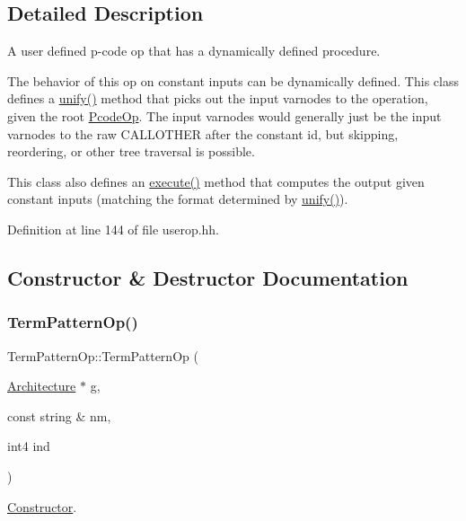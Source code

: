 \subsection{Detailed Description}
A user defined p-\/code op that has a dynamically defined procedure. 

The behavior of this op on constant inputs can be dynamically defined. This class defines a \mbox{\hyperlink{class_term_pattern_op_afe2a8a69c8f803e3134eaaaf087cc0b0}{unify()}} method that picks out the input varnodes to the operation, given the root \mbox{\hyperlink{class_pcode_op}{Pcode\+Op}}. The input varnodes would generally just be the input varnodes to the raw C\+A\+L\+L\+O\+T\+H\+ER after the constant id, but skipping, reordering, or other tree traversal is possible.

This class also defines an \mbox{\hyperlink{class_term_pattern_op_a766fd191b337e60fb882b2e7bc9b42a6}{execute()}} method that computes the output given constant inputs (matching the format determined by \mbox{\hyperlink{class_term_pattern_op_afe2a8a69c8f803e3134eaaaf087cc0b0}{unify()}}). 

Definition at line 144 of file userop.\+hh.



\subsection{Constructor \& Destructor Documentation}
\mbox{\label{class_term_pattern_op_a49bee3b1a5a9dcd0f037129f4d387d4d}} 
\subsubsection{\texorpdfstring{TermPatternOp()}{TermPatternOp()}}
{\footnotesize\ttfamily Term\+Pattern\+Op\+::\+Term\+Pattern\+Op (\begin{DoxyParamCaption}\item[{\mbox{\hyperlink{class_architecture}{Architecture}} $\ast$}]{g,  }\item[{const string \&}]{nm,  }\item[{int4}]{ind }\end{DoxyParamCaption})\hspace{0.3cm}{\ttfamily [inline]}}



\mbox{\hyperlink{class_constructor}{Constructor}}. 



